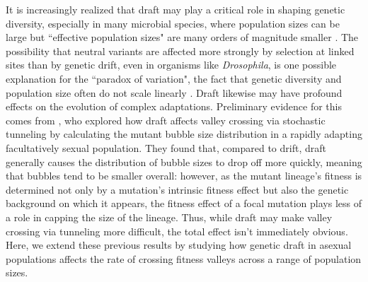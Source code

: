 \documentclass[10pt,twocolumn,twoside]{gsajnl}
\begin{document}
\begin{spacing}{1.5}
It is increasingly realized that draft may play a critical role in shaping genetic diversity, especially in many microbial species, where population sizes can be large but ``effective population sizes" are many orders of magnitude smaller \citep{masel_2011}.
The possibility that neutral variants are affected more strongly by selection at linked sites than by genetic drift, even in organisms like \emph{Drosophila}, is one possible explanation for the ``paradox of variation", the fact that genetic diversity and population size often do not scale linearly \citep{gillespie_2000, gillespie_2001, neher_kessinger_2013, corbett-detig_2015}.
Draft likewise may have profound effects on the evolution of complex adaptations. Preliminary evidence for this comes from
\citet{neher_shraiman_2011}, who explored how draft affects valley crossing via stochastic tunneling by calculating the mutant bubble size distribution in a rapidly adapting facultatively sexual population.
They found that, compared to drift, draft generally causes the distribution of bubble sizes to drop off more quickly, meaning that bubbles tend to be smaller overall: however, as the mutant lineage's fitness is determined not only by a mutation's intrinsic fitness effect but also the genetic background on which it appears, the fitness effect of a focal mutation plays less of a role in capping the size of the lineage.
Thus, while draft may make valley crossing via tunneling more difficult, the total effect isn't immediately obvious.
Here, we extend these previous results by studying how genetic draft in asexual populations affects the rate of crossing fitness valleys across a range of population sizes.


\end{spacing}
\end{document}
